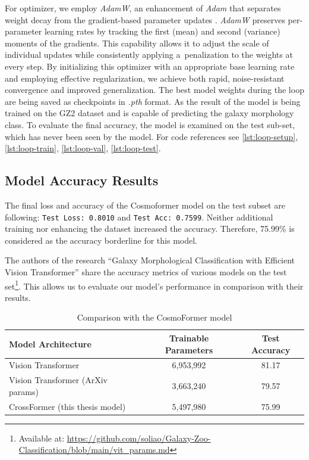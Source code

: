 For optimizer, we employ \textit{AdamW}, an enhancement of \textit{Adam} that separates weight decay from the gradient-based parameter updates \cite{yassin2024adam}. \textit{AdamW} preserves per-parameter learning rates by tracking the first (mean) and second (variance) moments of the gradients. This capability allows it to adjust the scale of individual updates while consistently applying a~penalization to the weights at every step. By initializing this optimizer with an appropriate base learning rate and employing effective regularization, we achieve both rapid, noise-resistant convergence and improved generalization. The best model weights during the loop are being saved as checkpoints in \textit{.pth} format. As the result of the model is being trained on the GZ2 dataset and is capable of predicting the galaxy morphology class. To evaluate the final accuracy, the model is examined on the test sub-set, which has never been seen by the model. For code references see \autoref{lst:loop-setup}, \autoref{lst:loop-train}, \autoref{lst:loop-val}, \autoref{lst:loop-test}.

\subsection*{Model Accuracy Results}
\label{sec:model-results}

The final loss and accuracy of the Cosmoformer model on the test subset are following: \texttt{Test Loss: 0.8010} and \texttt{Test Acc: 0.7599}. Neither additional training nor enhancing the dataset increased the accuracy. Therefore, 75.99\% is considered as the accuracy borderline  for this model.

The authors of the research \enquote{Galaxy Morphological Classification with Efficient Vision Transformer} \cite{lin2022galaxymorphologicalclassificationefficient} share the accuracy metrics of various models on the test set\footnote{Available at: \url{https://github.com/soliao/Galaxy-Zoo-Classification/blob/main/vit_params.md}}. This allows us to evaluate our model's performance in comparison with their results.

\begin{table}[hbt]
\centering
\caption{Comparison with the CosmoFormer model}
\label{models-compare-trained}
\begin{tabular}{|l|c|c|}
\hline
Model Architecture & Trainable Parameters & Test Accuracy \\ \hline
Vision Transformer \cite{lin2022galaxymorphologicalclassificationefficient} & 6,953,992	 & 81.17 \\ \hline
Vision Transformer (ArXiv params) \cite{lin2022galaxymorphologicalclassificationefficient} & 3,663,240 & 79.57 \\ \hline
CrossFormer (this thesis model) & 5,497,980 & 75.99 \\ \hline
\end{tabular}
\end{table}

